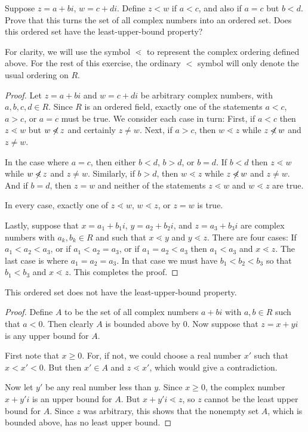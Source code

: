  Suppose $z = a + bi$, $w = c + di$. Define $z < w$ if
$a < c$, and also if $a = c$ but $b < d$. Prove that this turns the
set of all complex numbers into an ordered set. Does this ordered set
have the least-upper-bound property?
\begin{note}
  For clarity, we will use the symbol $\lessdot$ to represent the
  complex ordering defined above. For the rest of this exercise, the
  ordinary $<$ symbol will only denote the usual ordering on $R$.
\end{note}
\begin{proof}
  Let $z = a + bi$ and $w = c + di$ be arbitrary complex numbers, with
  $a,b,c,d\in R$. Since $R$ is an ordered field, exactly one of the
  statements $a < c$, $a > c$, or $a = c$ must be true. We consider
  each case in turn: First, if $a < c$ then $z \lessdot w$ but
  $w \not{\!\!\lessdot}\, z$ and certainly $z\neq w$. Next, if $a > c$, then
  $w \lessdot z$ while $z \not{\!\!\lessdot}\, w$ and $z\neq w$.

  In the case where $a = c$, then either $b < d$, $b > d$, or $b =
  d$. If $b < d$ then $z \lessdot w$ while $w \not{\!\!\lessdot}\, z$ and
  $z\neq w$. Similarly, if $b > d$, then $w \lessdot z$ while
  $z \not{\!\!\lessdot}\, w$ and $z\neq w$. And if $b = d$, then $z = w$ and
  neither of the statements $z \lessdot w$ and $w \lessdot z$ are
  true.

  In every case, exactly one of $z \lessdot w$, $w \lessdot z$, or
  $z = w$ is true.

  Lastly, suppose that $x = a_1 + b_1i$, $y = a_2 + b_2i$, and
  $z = a_3 + b_3i$ are complex numbers with $a_k,b_k\in R$ and such
  that $x \lessdot y$ and $y \lessdot z$. There are four cases: If
  $a_1 < a_2 < a_3$, or if $a_1 < a_2 = a_3$, or if $a_1 = a_2 < a_3$
  then $a_1 < a_3$ and $x \lessdot z$. The last case is where
  $a_1 = a_2 = a_3$. In that case we must have $b_1 < b_2 < b_3$ so
  that $b_1 < b_3$ and $x \lessdot z$. This completes the proof.
\end{proof}

\begin{claim}
  This ordered set does not have the least-upper-bound property.
\end{claim}
\begin{proof}
  Define $A$ to be the set of all complex numbers $a + bi$ with
  $a,b\in R$ such that $a < 0$. Then clearly $A$ is bounded above by
  $0$. Now suppose that $z = x + yi$ is any upper bound for $A$.

  First note that $x\geq0$. For, if not, we could choose a real number
  $x'$ such that $x < x' < 0$. But then $x'\in A$ and $z\lessdot x'$,
  which would give a contradiction.

  Now let $y'$ be any real number less than $y$. Since $x\geq0$, the
  complex number $x + y'i$ is an upper bound for $A$. But
  $x + y'i \lessdot z$, so $z$ cannot be the least upper bound for
  $A$. Since $z$ was arbitrary, this shows that the nonempty set $A$,
  which is bounded above, has no least upper bound.
\end{proof}

